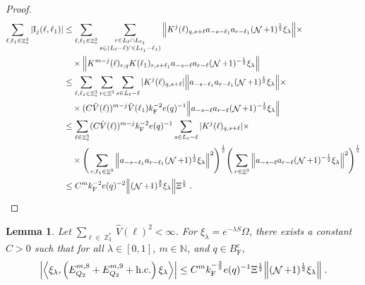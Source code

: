 \documentclass[12pt,a4paper]{article}
\numberwithin{equation}{section}
\newcommand{\NNN}{\mathbb{N}}
\newcommand{\1}{\mathbb{I}}
\newcommand{\F}{\mathrm{F}}
\newcommand{\I}{\mathrm{I}}
\DeclareMathOperator{\Z}{\mathbb{Z}}
\DeclareMathOperator{\NN}{\mathcal{N}}
\newcommand{\half}{\frac{1}{2}}
\newcommand{\eva}[1]{\left\langle #1 \right\rangle}
\theoremstyle{plain}
\newtheorem{lemma}[theorem]{Lemma}
\theoremstyle{definition}
\theoremstyle{remark}
\theoremstyle{plain}
\theoremstyle{definition}
\theoremstyle{remark}
\begin{document}
\begin{proof}
{\begin{align}
	\sum_{\ell,\ell_1 \in \Z^3_*} |\I_j(\ell, \ell_1)|
	&\leq \sum_{\ell,\ell_1 \in \Z^3_*} \sum\limits_{\substack{r\in L_{\ell} \cap L_{\ell_1}\\ s \in (L_{\ell} - \ell) \cap (L_{\ell_1} - \ell_1)}}
		\norm{ K^{j}(\ell)_{q,s+\ell} a_{-s-\ell_1} a_{r-\ell_1} (\NN+1)^{\half} \xi_\lambda} \nonumber \times \\ 
	&\quad \times \norm{ K^{m-j}(\ell)_{r,q} K(\ell_1)_{r,s+\ell_1} a_{-s-\ell}a_{r-\ell} (\NN+1)^{-\half} \xi_\lambda } \nonumber\\
	&\leq \sum_{\ell,\ell_1 \in \Z^3_*}
		\sum_{r\in \Z^3} \sum_{s \in L_{\ell} - \ell}
		|K^{j}(\ell)_{q,s+\ell}|
		\norm{ a_{-s-\ell_1} a_{r-\ell_1} (\NN+1)^{\half} \xi_\lambda} \times \nonumber\\
	&\quad \times (C \hat{V}(\ell))^{m-j} \hat{V}(\ell_1) k_{\F}^{-2} e(q)^{-1}
		\norm{ a_{-s-\ell}a_{r-\ell} (\NN+1)^{-\half} \xi_\lambda } \nonumber\\
	&\leq \sum_{\ell \in \Z^3_*} (C \hat{V}(\ell))^{m-j} k_{\F}^{-2} e(q)^{-1}
		\sum_{s \in L_{\ell} - \ell}
		|K^{j}(\ell)_{q,s+\ell}| \times \nonumber\\
	&\quad \times \Bigg( \sum_{r,\ell_1 \in \Z^3} \norm{ a_{-s-\ell_1} a_{r-\ell_1} (\NN+1)^{\half} \xi_\lambda}^2 \Bigg)^{\half}
		\Bigg( \sum_{r \in \Z^3} \norm{ a_{-s-\ell}a_{r-\ell} (\NN+1)^{-\half} \xi_\lambda }^2 \Bigg)^{\half} \nonumber\\
	&\leq C^m k_{\F}^{-2} e(q)^{-2}
		\norm{(\NN+1)^{\frac 32} \xi_\lambda} \Xi^{\half} \;. \label{eq:estEQ2132}
\end{align} 
}
\end{proof}


\begin{lemma} \label{lem:EQ218}
Let $ \sum_{\ell \in \Z_3^*} \hat{V}(\ell)^2 < \infty $. For $\xi_\lambda = e^{-\lambda S} \Omega$, there exists a constant $ C > 0 $ such that for all $ \lambda \in [0,1] $, $ m \in \NNN $, and $ q \in B_{\F}^c $,
\begin{align}
	\abs{\eva{\xi_\lambda,\left(E^{m,8}_{Q_2}+E^{m,9}_{Q_2}+\mathrm{h.c.}\right) \xi_\lambda }}
	\leq C^m k_{\F}^{-\frac 32} e(q)^{-1} \Xi^\half \norm{(\NN+1)^{\half} \xi_\lambda} \;.\label{eq:estEQ218}
\end{align}
\end{lemma}
\end{document}
